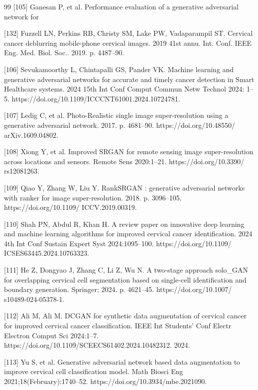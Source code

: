 \documentclass[final,5p,times,twocolumn,authoryear]{elsarticle}
\begin{document}
\begin{thebibliography}{99}
 [105] Ganesan P, et al. Performance evaluation of a generative adversarial network for

 [132] Fuzzell LN, Perkins RB, Christy SM, Lake PW, Vadaparampil ST. Cervical cancer deblurring mobile-phone cervical images. 2019 41st annu. Int. Conf. IEEE Eng. Med. Biol. Soc.. 2019. p. 4487–90.

 [106] Sevukamoorthy L, Chintapalli GS, Pander VK. Machine learning and generative adversarial networks for accurate and timely cancer detection in Smart Healthcare systems. 2024 15th Int Conf Comput Commun Netw Technol 2024: 1–5. https://doi.org/10.1109/ICCCNT61001.2024.10724781.

 [107] Ledig C, et al. Photo-Realistic single image super-resolution using a generative adversarial network. 2017. p. 4681–90. https://doi.org/10.48550/ arXiv.1609.04802.

 [108] Xiong Y, et al. Improved SRGAN for remote sensing image super-resolution across locations and sensors. Remote Sens 2020:1–21. https://doi.org/10.3390/ rs12081263.

 [109] Qiao Y, Zhang W, Liu Y. RankSRGAN : generative adversarial networks with ranker for image super-resolution. 2018. p. 3096–105. https://doi.org/10.1109/ ICCV.2019.00319.

 [110] Shah PN, Abdul R, Khan H. A review paper on innovative deep learning and machine learning algorithms for improved cervical cancer identification. 2024 4th Int Conf Sustain Expert Syst 2024:1095–100. https://doi.org/10.1109/ ICSES63445.2024.10763323.

 [111] He Z, Dongyao J, Zhang C, Li Z, Wu N. A two-stage approach solo_GAN for overlapping cervical cell segmentation based on single-cell identification and boundary generation. Springer; 2024. p. 4621–45. https://doi.org/10.1007/ s10489-024-05378-1.

 [112] Ali M, Ali M. DCGAN for synthetic data augmentation of cervical cancer for improved cervical cancer classification. IEEE Int Students’ Conf Electr Electron Comput Sci 2024:1–7. https://doi.org/10.1109/SCEECS61402.2024.10482312. 2024.

 [113] Yu S, et al. Generative adversarial network based data augmentation to improve cervical cell classification model. Math Biosci Eng 2021;18(February):1740–52. https://doi.org/10.3934/mbe.2021090.


\end{thebibliography}
\end{document}
